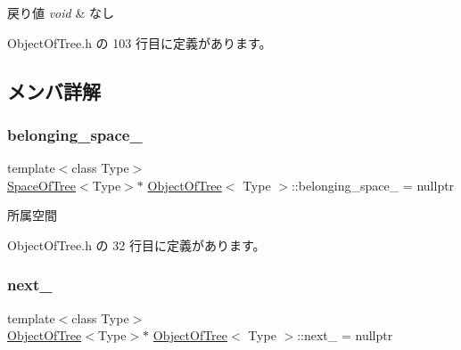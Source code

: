 \begin{DoxyRetVals}{戻り値}
{\em void} & なし \\
\hline
\end{DoxyRetVals}


 Object\+Of\+Tree.\+h の 103 行目に定義があります。



\subsection{メンバ詳解}
\mbox{\label{class_object_of_tree_a4f0673854adc10539b4b99558ea3b696}} 
\subsubsection{\texorpdfstring{belonging\+\_\+space\+\_\+}{belonging\_space\_}}
{\footnotesize\ttfamily template$<$class Type$>$ \\
\mbox{\hyperlink{class_space_of_tree}{Space\+Of\+Tree}}$<$Type$>$$\ast$ \mbox{\hyperlink{class_object_of_tree}{Object\+Of\+Tree}}$<$ Type $>$\+::belonging\+\_\+space\+\_\+ = nullptr\hspace{0.3cm}{\ttfamily [private]}}



所属空間 



 Object\+Of\+Tree.\+h の 32 行目に定義があります。

\mbox{\label{class_object_of_tree_af76d6e92ce202ad91b48896a6a5af95f}} 
\subsubsection{\texorpdfstring{next\+\_\+}{next\_}}
{\footnotesize\ttfamily template$<$class Type$>$ \\
\mbox{\hyperlink{class_object_of_tree}{Object\+Of\+Tree}}$<$Type$>$$\ast$ \mbox{\hyperlink{class_object_of_tree}{Object\+Of\+Tree}}$<$ Type $>$\+::next\+\_\+ = nullptr\hspace{0.3cm}{\ttfamily [private]}}



